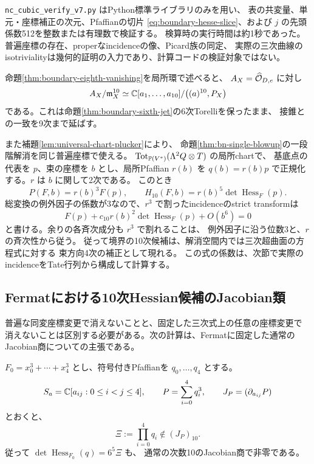 \begin{remark}[厳密検算の範囲]
\texttt{nc\_cubic\_verify\_v7.py} はPython標準ライブラリのみを用い、
表の共変量、単元・座標補正の次元、Pfaffianの切片
\eqref{eq:boundary-hesse-slice}、および $j$ の先頭係数512を整数または有理数で検証する。
検算時の実行時間は約1秒であった。
普遍座標の存在、properなincidenceの像、Picard族の同定、
実際の三次曲線のisotrivialityは幾何的証明の入力であり、計算コードの検証対象ではない。
\end{remark}


\begin{remark}
命題\ref{thm:boundary-eighth-vanishing}を局所環で述べると、
$A_X=\widehat{\mathcal O}_{D,e}$ に対し
\[
 A_X/\mathfrak m_X^{10}
 \simeq\mathbb C[a_1,\ldots,a_{10}]/\bigl((a)^{10},P_X\bigr)
\]
である。これは命題\ref{thm:boundary-sixth-jet}の6次Torelliを保ったまま、
接錐との一致を9次まで延ばす。

また補題\ref{lem:universal-chart-plucker}により、
命題\ref{thm:bn-single-blowup}の一段階解消を同じ普遍座標で使える。
$\operatorname{Tot}_{\mathbb P(V^*)}(\Lambda^2Q\otimes T)$ の局所chartで、
基底点の代表を $p$、束の座標を $b$ とし、局所Pfaffian $r(b)$ を
$q(b)=r(b)p$ で正規化する。$r$ は $b$ に関して2次である。
このとき
\[
 P(F,b)=r(b)^3F(p),\qquad
 H_{10}(F,b)=r(b)^5\det\operatorname{Hess}_F(p).
\]
総変換の例外因子の係数が3なので、$r^3$ で割ったincidenceのstrict transformは
\[
 F(p)+c_{10}r(b)^2\det\operatorname{Hess}_F(p)+O(b^6)=0
\]
と書ける。余りの各斉次成分も $r^3$ で割れることは、
例外因子に沿う位数3と、$r$ の斉次性から従う。
従って境界の10次候補は、解消空間内では三次超曲面の方程式に対する
束方向4次の補正として現れる。
この式の係数は、次節で実際のincidenceをTate行列から構成して計算する。
\end{remark}

\subsection{Fermatにおける10次Hessian候補のJacobian類}

普遍な同変座標変更で消えないことと、固定した三次式上の任意の座標変更で
消えないことは区別する必要がある。次の計算は、Fermatに固定した通常のJacobian商についての主張である。

\begin{lemma}[10次候補の非零類]
\label{lem:fermat-tenth-jacobian}
$F_0=x_0^3+\cdots+x_4^3$ とし、符号付きPfaffianを $q_0,\ldots,q_4$ とする。
\[
 S_a=\mathbb C[a_{ij}:0\le i<j\le4],\qquad
 P=\sum_{i=0}^4q_i^3,\qquad J_P=(\partial_{a_{ij}}P)
\]
とおくと、
\[
                  \Xi:=\prod_{i=0}^4q_i\notin(J_P)_{10}.
\]
従って $\det\operatorname{Hess}_{F_0}(q)=6^5\Xi$ も、
通常の次数10のJacobian商で非零である。
\end{lemma}

